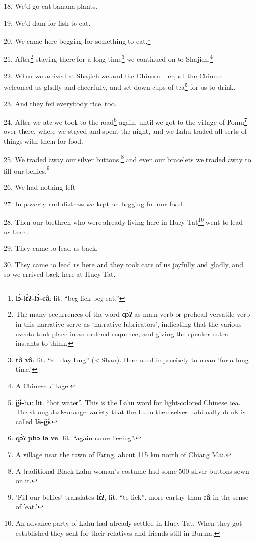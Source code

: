 18. We'd go eat banana plants.

19. We'd dam for fish to eat.

20. We came here begging for something to eat.\footnote{\textbf{lɔ̀-lɛ̀ʔ-lɔ̀-câ}: lit. ``beg-lick-beg-eat.''}

21. After\footnote{The many occurrences of the word \textbf{qɔ̀ʔ} as main verb or prehead versatile verb in this narrative serve as `narrative-lubricators', indicating that the various events took place in an ordered sequence, and giving the speaker extra instants to think.} staying there for a long time\footnote{\textbf{tâ-vâ}: lit. ``all day long'' (< Shan). Here used imprecisely to mean 'for a long time.'} we continued on to Shajieh.\footnote{A Chinese village.}

22. When we arrived at Shajieh we and the Chinese -- er, all the Chinese welcomed
us gladly and cheerfully, and set down cups of tea\footnote{\textbf{g̈ɨ̀-hɔ}: lit. ``hot water''. This is the Lahu word for light-colored Chinese tea. The strong dark-orange variety that the Lahu themselves habitually drink is called \textbf{là-g̈ɨ̀}.} for us to drink.

23. And they fed everybody rice, too.

24. After we ate we took to the road\footnote{\textbf{qɔ̀ʔ} \textbf{phɔ} \textbf{la} \textbf{ve}: lit. ``again came fleeing''.} again, until we got to the village of Pomu\footnote{A village near the town of Farng, about 115 km north of Chiang Mai.}
over there, where we stayed and spent the night, and we Lahu traded all sorts of
things with them for food.

25. We traded away our silver buttons,\footnote{A traditional Black Lahu woman's costume had some 500 silver buttons sewn on it.} and even our bracelets we traded away
to fill our bellies.\footnote{'Fill our bellies' translates \textbf{lɛ̀ʔ}, lit. ``to lick'', more earthy than \textbf{câ} in the sense of 'eat.'}

26. We had nothing left.

27. In poverty and distress we kept on begging for our food.

28. Then our brethren who were already living here in Huey Tat\footnote{An advance party of Lahu had already settled in Huey Tat. When they got established they sent for their relatives and friends still in Burma.} went to lead
us back.

29. They came to lead us back.

30. They came to lead us here and they took care of us joyfully and gladly, and
so we arrived back here at Huey Tat.

